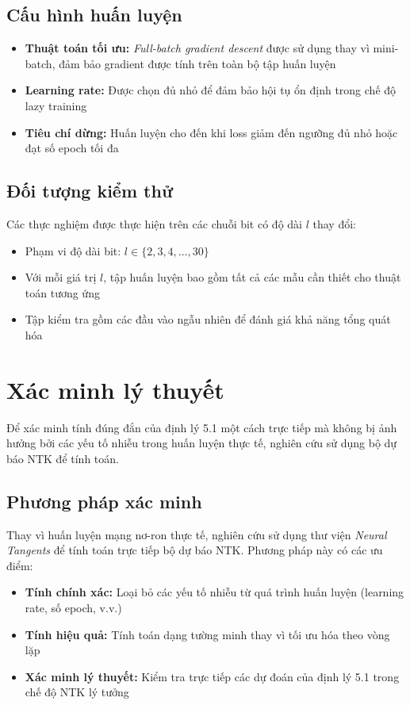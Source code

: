 \subsection{Cấu hình huấn luyện}

\begin{itemize}
    \item \textbf{Thuật toán tối ưu:} \textit{Full-batch gradient descent} được sử dụng thay vì mini-batch, đảm bảo gradient được tính trên toàn bộ tập huấn luyện
    \item \textbf{Learning rate:} Được chọn đủ nhỏ để đảm bảo hội tụ ổn định trong chế độ lazy training
    \item \textbf{Tiêu chí dừng:} Huấn luyện cho đến khi loss giảm đến ngưỡng đủ nhỏ hoặc đạt số epoch tối đa
\end{itemize}

\subsection{Đối tượng kiểm thử}

Các thực nghiệm được thực hiện trên các chuỗi bit có độ dài $l$ thay đổi:
\begin{itemize}
    \item Phạm vi độ dài bit: $l \in \{2, 3, 4, \ldots, 30\}$
    \item Với mỗi giá trị $l$, tập huấn luyện bao gồm tất cả các mẫu cần thiết cho thuật toán tương ứng
    \item Tập kiểm tra gồm các đầu vào ngẫu nhiên để đánh giá khả năng tổng quát hóa
\end{itemize}

\section{Xác minh lý thuyết}

Để xác minh tính đúng đắn của định lý 5.1 một cách trực tiếp mà không bị ảnh hưởng bởi các yếu tố nhiễu trong huấn luyện thực tế, nghiên cứu sử dụng bộ dự báo NTK để tính toán.

\subsection{Phương pháp xác minh}

Thay vì huấn luyện mạng nơ-ron thực tế, nghiên cứu sử dụng thư viện \textit{Neural Tangents} để tính toán trực tiếp bộ dự báo NTK. Phương pháp này có các ưu điểm:
\begin{itemize}
    \item \textbf{Tính chính xác:} Loại bỏ các yếu tố nhiễu từ quá trình huấn luyện (learning rate, số epoch, v.v.)
    \item \textbf{Tính hiệu quả:} Tính toán dạng tường minh thay vì tối ưu hóa theo vòng lặp
    \item \textbf{Xác minh lý thuyết:} Kiểm tra trực tiếp các dự đoán của định lý 5.1 trong chế độ NTK lý tưởng
\end{itemize}

